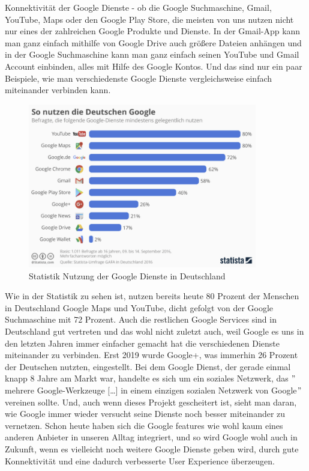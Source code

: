 Konnektivität der Google Dienste - ob die Google Suchmaschine, Gmail, YouTube, Maps oder den Google Play Store,
die meisten von uns nutzen nicht nur eines der zahlreichen Google Produkte und Dienste.
In der Gmail-App kann man ganz einfach mithilfe von Google Drive auch größere Dateien anhängen und in der Google Suchmaschine kann man ganz einfach seinen YouTube und Gmail Account einbinden, alles mit Hilfe des Google Kontos.
Und das sind nur ein paar Beispiele, wie man verschiedenste Google Dienste vergleichsweise einfach miteinander verbinden kann.
\begin{figure}[ht]
    \centering
    \includegraphics[width=100mm]{images/statistic_googleServices}
    \caption{Statistik Nutzung der Google Dienste in Deutschland}
    \label{fig:statisticGoogleServices}
\end{figure}  %
Wie in der Statistik zu sehen ist, nutzen bereits heute 80 Prozent der Menschen in Deutschland Google Maps und YouTube, dicht gefolgt von der Google Suchmaschine mit 72 Prozent.
Auch die restlichen Google Services sind in Deutschland gut vertreten und das wohl nicht zuletzt auch,
weil Google es uns in den letzten Jahren immer einfacher gemacht hat die verschiedenen Dienste miteinander zu verbinden.
Erst 2019 wurde Google+, was immerhin 26 Prozent der Deutschen nutzten, eingestellt.
Bei dem Google Dienst, der gerade einmal knapp 8 Jahre am Markt war, handelte es sich um ein soziales Netzwerk,
das \("\)mehrere Google-Werkzeuge [\ldots] in einem einzigen sozialen Netzwerk von Google\("\)\cite{JEC21} vereinen sollte.\cite{JEC21}
Und, auch wenn dieses Projekt gescheitert ist, sieht man daran, wie Google immer wieder versucht seine Dienste noch besser miteinander zu vernetzen.
Schon heute haben sich die Google features wie wohl kaum eines anderen Anbieter in unseren Alltag integriert,
und so wird Google wohl auch in Zukunft, wenn es vielleicht noch weitere Google Dienste geben wird, durch gute Konnektivität und eine dadurch verbesserte User Experience überzeugen.\\

